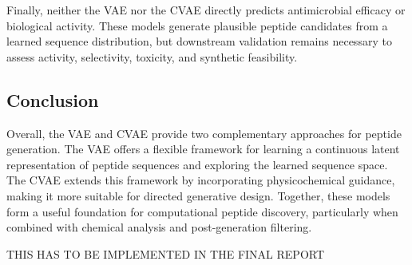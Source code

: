 Finally, neither the VAE nor the CVAE directly predicts antimicrobial efficacy or biological activity. These models generate plausible peptide candidates from a learned sequence distribution, but downstream validation remains necessary to assess activity, selectivity, toxicity, and synthetic feasibility.

\subsection{Conclusion}

Overall, the VAE and CVAE provide two complementary approaches for peptide generation. The VAE offers a flexible framework for learning a continuous latent representation of peptide sequences and exploring the learned sequence space. The CVAE extends this framework by incorporating physicochemical guidance, making it more suitable for directed generative design. Together, these models form a useful foundation for computational peptide discovery, particularly when combined with chemical analysis and post-generation filtering.


THIS HAS TO BE IMPLEMENTED IN THE FINAL REPORT